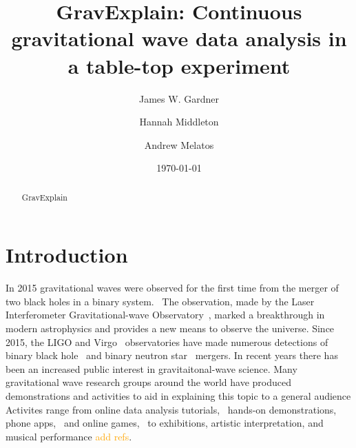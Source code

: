 \documentclass[prb,preprint]{revtex4-1}
\newcommand{\han}{\textcolor{orange}}
\begin{document}
\title{GravExplain: Continuous gravitational wave data analysis in a table-top experiment}

\author{James W. Gardner}

\author{Hannah Middleton}
\author{Andrew Melatos}

\date{\today}

\begin{abstract}
GravExplain

\end{abstract}

\maketitle

\section{Introduction}

In 2015 gravitational waves were observed for the first time from the merger of two black holes in a binary system.~\cite{GW150914} 
The observation, made by the Laser Interferometer Gravitational-wave Observatory~\citep[LIGO]{AdvancedLIGO:2015}, marked a breakthrough in modern astrophysics and provides a new means to observe the universe. 
Since 2015, the LIGO and Virgo~\cite{AdvancedVirgo:2015} observatories have made numerous detections of binary black hole~\cite{GW151226,GW170104,GW170814} and binary neutron star~\cite{GW170817,GW170817multi,GW190425} mergers. 
In recent years there has been an increased public interest in gravitaitonal-wave science. 
Many gravitational wave research groups around the world have produced demonstrations and activities to aid in explaining this topic to a general audience
Activites range from online data analysis tutorials,~\cite{GWOSC:online,LOSC:2015} hands-on demonstrations, phone apps,~\cite{LaserLabs:online,SciVR:online} and online games,~\cite{BlackHoleHunter:online} to exhibitions,\cite{L2URSSE} artistic interpretation, and musical performance \han{add refs}. 
\end{document}
